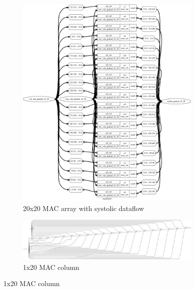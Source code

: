 \documentclass[11pt]{article}
\begin{document}
\begin{figure}[H]
    \centering
    \begin{subfigure}{.45\textwidth}
      \centering
      \begin{framed}
        \includegraphics[width=\linewidth]{images/mac20x20.dot.png}
        \caption{20x20 MAC array with systolic dataflow}
      \end{framed}
    \end{subfigure}
    \begin{subfigure}{.45\textwidth}
      \centering
      \begin{framed}
        \includegraphics[width=\linewidth]{images/mac_col.dot.png}
        \caption{1x20 MAC column}
      \end{framed}
      \begin{framed}

\end{framed}
\end{subfigure}
\end{figure}
\end{document}
